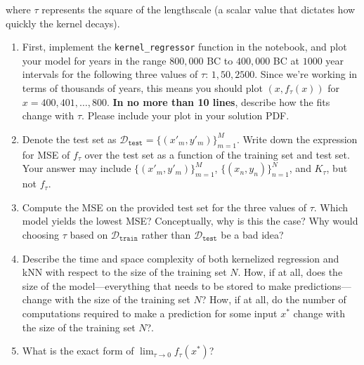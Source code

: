 \documentclass[submit]{../harvardml}
\begin{document}
\begin{problem}
\begin{enumerate}
where $\tau$ represents the square of the lengthscale (a scalar value that
dictates how quickly the kernel decays).  


\begin{enumerate}
    
  \item First, implement the \texttt{kernel\_regressor} function in the notebook, and plot your model for years in the range $800,000$ BC to $400,000$ BC at $1000$ year intervals for the following three values of $\tau$: $1, 50, 2500$. Since we're working in terms of thousands of years, this means you should plot $(x, f_\tau(x))$ for $x = 400, 401, \dots, 800$. \textbf{In no more than 10 lines}, describe how the fits change with $\tau$. Please include your plot in your solution PDF.

  \item Denote the test set as $\mathcal{D}_\texttt{test} = \{(x'_m, y'_m)\}_{m = 1} ^M$.  Write down the expression for MSE of $f_\tau$ over the test set as a function of the training set and test set. Your answer may include $\{(x'_m, y'_m)\}_{m = 1} ^M$, $\{(x_n, y_n)\}_{n = 1} ^N$, and $K_\tau$, but not $f_\tau$.

    \item Compute the MSE on the provided test set for the three values of $\tau$.  Which model yields the lowest MSE? Conceptually, why is this the case? Why would choosing $\tau$ based on $\mathcal{D}_\texttt{train}$ rather than $\mathcal{D}_\texttt{test}$ be a bad idea? 

  \item Describe the time and space complexity of both kernelized regression and kNN with respect to the size of the training set $N$.  How, if at all, does the size of the model---everything that needs to be stored to make predictions---change with the size of the training set $N$?  How, if at all, do the number of computations required to make a prediction for some input $x^*$ change with the size of the training set $N$?.
  

  \item  What is the exact form of $\lim_{\tau \to 0 }f_\tau(x^*)$?
  \end{enumerate}
\end{enumerate}
\end{problem}
\end{document}
